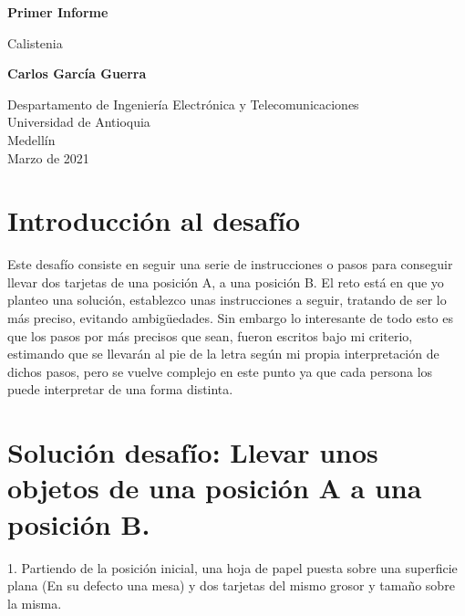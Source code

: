 \documentclass{article}
\begin{document}
\begin{titlepage}
    \begin{center}
        \vspace*{1cm}
            
        \Huge
        \textbf{Primer Informe}
            
        \vspace{0.5cm}
        \LARGE
        Calistenia
            
        \vspace{1.5cm}
            
        \textbf{Carlos García Guerra}
            
        \vfill
            
        \vspace{0.8cm}
            
        \Large
        Despartamento de Ingeniería Electrónica y Telecomunicaciones\\
        Universidad de Antioquia\\
        Medellín\\
        Marzo de 2021
            
    \end{center}
\end{titlepage}


\newpage
\section{Introducción al desafío}
Este desafío consiste en seguir una serie de instrucciones o pasos para conseguir llevar dos tarjetas de una posición A, a una posición B. El reto está en que yo planteo una solución, establezco unas instrucciones a seguir, tratando de ser lo más preciso, evitando ambigüedades. Sin embargo lo interesante de todo esto es que los pasos por más precisos que sean, fueron escritos bajo mi criterio, estimando que se llevarán al pie de la letra según mi propia interpretación de dichos pasos, pero se vuelve complejo en este punto ya que cada persona los puede interpretar de una forma distinta.
\section {Solución desafío: Llevar unos objetos de una posición A a una posición B.}
1. Partiendo de la posición inicial, una hoja de papel puesta sobre una superficie plana (En su defecto una mesa) y dos tarjetas del mismo grosor y tamaño sobre la misma.\\
\end{document}
